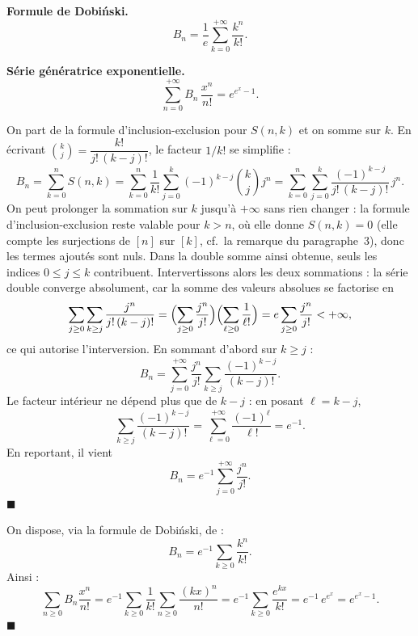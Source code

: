 \begin{tcolorbox}[thmbox]
  \textbf{Formule de Dobi\'nski.}\enspace%
  \[
    B_n = \frac{1}{e}\sum_{k=0}^{+\infty}\frac{k^n}{k!}.
  \]

  \medskip
  \textbf{Série génératrice exponentielle.}\enspace%
  \[
    \sum_{n=0}^{+\infty} B_n\,\frac{x^n}{n!} = e^{e^x - 1}.
  \]
\end{tcolorbox}


\begin{mdframed}[style=proofbar]
  On part de la formule d'inclusion-exclusion pour $S(n,k)$ et on somme sur
  $k$. En écrivant $\binom{k}{j}=\dfrac{k!}{j!\,(k-j)!}$, le facteur $1/k!$ se
  simplifie :
  \[
    B_n = \sum_{k=0}^{n} S(n,k)
        = \sum_{k=0}^{n}\frac{1}{k!}\sum_{j=0}^{k}{(-1)}^{k-j}\binom{k}{j}j^n
        = \sum_{k=0}^{n}\sum_{j=0}^{k}\frac{{(-1)}^{k-j}}{j!\,(k-j)!}\,j^n.
  \]
  On peut prolonger la sommation sur $k$ jusqu'à $+\infty$ sans rien changer :
  la formule d'inclusion-exclusion reste valable pour $k>n$, où elle donne
  $S(n,k)=0$ (elle compte les surjections de $[n]$ sur $[k]$, cf.\ la remarque
  du paragraphe~3), donc les termes ajoutés sont nuls. Dans la double somme ainsi
  obtenue, seuls les indices $0\leq j\leq k$ contribuent.
  Intervertissons alors les deux sommations : la série double converge
  absolument, car la somme des valeurs absolues se factorise en
  \[
    \sum_{j\geq 0}\sum_{k\geq j}\frac{j^n}{j!\,(k-j)!}
      = \Bigl(\sum_{j\geq 0}\frac{j^n}{j!}\Bigr)
        \Bigl(\sum_{\ell\geq 0}\frac{1}{\ell!}\Bigr)
      = e\sum_{j\geq 0}\frac{j^n}{j!} < +\infty,
  \]
  ce qui autorise l'interversion. En sommant d'abord sur $k\geq j$ :
  \[
    B_n = \sum_{j=0}^{+\infty}\frac{j^n}{j!}
          \sum_{k\geq j}\frac{{(-1)}^{k-j}}{(k-j)!}.
  \]
  Le facteur intérieur ne dépend plus que de $k-j$ : en posant $\ell=k-j$,
  \[
    \sum_{k\geq j}\frac{{(-1)}^{k-j}}{(k-j)!}
      = \sum_{\ell=0}^{+\infty}\frac{{(-1)}^{\ell}}{\ell!}
      = e^{-1}.
  \]
  En reportant, il vient
  \[
    B_n = e^{-1}\sum_{j=0}^{+\infty}\frac{j^n}{j!}.
  \]
  $\blacksquare$
\end{mdframed}


\begin{mdframed}[style=proofbar]
  On dispose, via la formule de Dobi\'nski, de :
  \[
    B_n = e^{-1}\sum_{k\geq 0}\frac{k^n}{k!}.
  \]
  Ainsi :
  \[
    \sum_{n\geq 0}B_n\frac{x^n}{n!}
    = e^{-1}\sum_{k\geq 0}\frac{1}{k!}\sum_{n\geq 0}\frac{{(kx)}^n}{n!}
    = e^{-1}\sum_{k\geq 0}\frac{e^{kx}}{k!}
    = e^{-1}\,e^{e^x}
    = e^{e^x - 1}.
  \]
  $\blacksquare$
\end{mdframed}

